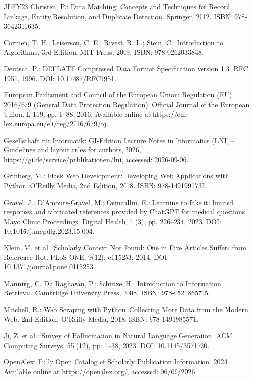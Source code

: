 \documentclass[12pt,a4paper,oneside]{report}
\begin{document}
\begin{thebibliography}{JLFY23}
Christen, P.: Data Matching: Concepts and Techniques for Record Linkage, Entity Resolution, and Duplicate Detection. Springer, 2012. ISBN: 978-3642311635.

Cormen, T. H.; Leiserson, C. E.; Rivest, R. L.; Stein, C.: Introduction to Algorithms. 3rd Edition, MIT Press, 2009. ISBN: 978-0262033848.

Deutsch, P.: DEFLATE Compressed Data Format Specification version 1.3. RFC 1951, 1996. DOI: 10.17487/RFC1951.

European Parliament and Council of the European Union: Regulation (EU) 2016/679 (General Data Protection Regulation). Official Journal of the European Union, L 119, pp. 1--88, 2016. Available online at \url{https://eur-lex.europa.eu/eli/reg/2016/679/oj}.

Gesellschaft für Informatik: GI-Edition Lecture Notes in Informatics (LNI) -- Guidelines and layout rules for authors, 2026, \url{https://gi.de/service/publikationen/lni}, accessed: 2026-09-06.

Grinberg, M.: Flask Web Development: Developing Web Applications with Python. O'Reilly Media, 2nd Edition, 2018. ISBN: 978-1491991732.

Gravel, J.; D'Amours-Gravel, M.; Osmanlliu, E.: Learning to fake it: limited responses and fabricated references provided by ChatGPT for medical questions. Mayo Clinic Proceedings: Digital Health, 1 (3), pp. 226--234, 2023. DOI: 10.1016/j.mcpdig.2023.05.004.

Klein, M. et al.: Scholarly Context Not Found: One in Five Articles Suffers from Reference Rot. PLoS ONE, 9(12), e115253, 2014. DOI: 10.1371/journal.pone.0115253.

Manning, C. D.; Raghavan, P.; Schütze, H.: Introduction to Information Retrieval. Cambridge University Press, 2008. ISBN: 978-0521865715.

Mitchell, R.: Web Scraping with Python: Collecting More Data from the Modern Web. 2nd Edition, O'Reilly Media, 2018. ISBN: 978-1491985571.

Ji, Z. et al.: Survey of Hallucination in Natural Language Generation. ACM Computing Surveys, 55 (12), pp. 1--38, 2023. DOI: 10.1145/3571730.

OpenAlex: Fully Open Catalog of Scholarly Publication Information. 2024. Available online at \url{https://openalex.org/}, accessed: 06/09/2026.


\end{thebibliography}
\end{document}
